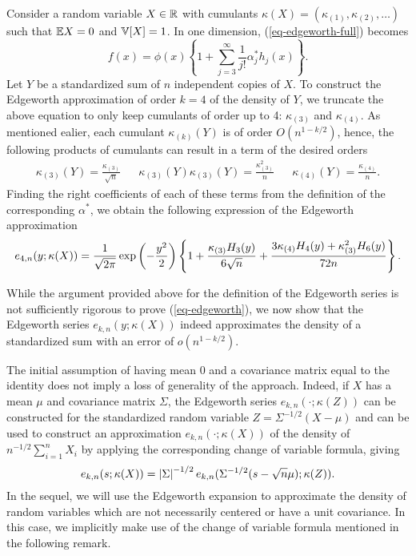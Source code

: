 \begin{example} \label{ex-edgeworth-1d}
    Consider a random variable $X \in \mathbb{R}$ with cumulants $\kappa(X) = (\kappa_{(1)}, \kappa_{(2)}, \ldots)$ such that $\mathbb{E}{X} = 0$ and $\mathbb{V}[X] = 1$. In one dimension, (\ref{eq-edgeworth-full}) becomes
    \begin{equation*}
        f(x) = \phi(x) \left\{
            1 + \sum_{j=3}^\infty  \frac{1}{j!}\alpha^*_j h_j(x)
        \right\}.
    \end{equation*}
    Let $Y$ be a standardized sum of $n$ independent copies of $X$. To construct the Edgeworth approximation of order $k = 4$ of the density of $Y$, we truncate the above equation to only keep cumulants of order up to 4: $\kappa_{(3)}$ and $\kappa_{(4)}$. As mentioned ealier, each cumulant $\kappa_{(k)}(Y)$ is of order $O(n^{1-k/2})$, hence, the following products of cumulants can result in a term of the desired orders
    \begin{align*}
        \kappa_{(3)}(Y) = \frac{\kappa_{(3)}}{\sqrt{n}} && \kappa_{(3)}(Y)\kappa_{(3)}(Y) = \frac{\kappa_{(3)}^2}{n} && \kappa_{(4)}(Y) = \frac{\kappa_{(4)}}{n}.
    \end{align*}
    Finding the right coefficients of each of these terms from the definition of the corresponding $\alpha^*$, we obtain the following expression of the Edgeworth approximation
    \begin{equation} \label{eq-edgeworth-1d-4}
        e_{4, n}(y; \kappa(X)) = \frac{1}{\sqrt{2\pi}}\exp\left(-\frac{y^2}{2}\right)\left\{1 + \frac{\kappa_{(3)} H_3(y)}{6\sqrt{n}} + \frac{3\kappa_{(4)} H_4(y) + \kappa_{(3)}^2 H_6(y)}{72 n}\right\}.
    \end{equation}
\end{example}

While the argument provided above for the definition of the Edgeworth series is not sufficiently rigorous to prove (\ref{eq-edgeworth}), we now show that the Edgeworth series $e_{k, n}(y; \kappa(X))$ indeed approximates the density of a standardized sum with an error of $o(n^{1-k/2})$.

\begin{remark} \label{rem-centering}
    The initial assumption of having mean 0 and a covariance matrix equal to the identity does not imply a loss of generality of the approach. Indeed, if $X$ has a mean $\mu$ and covariance matrix $\Sigma$, the Edgeworth series $e_{k, n}(\cdot; \kappa(Z))$ can be constructed for the standardized random variable $Z = \Sigma^{-1/2}(X - \mu)$ and can be used to construct an approximation $e_{k, n}(\cdot; \kappa(X))$ of the density of $n^{-1/2} \sum_{i=1}^n X_i$ by applying the corresponding change of variable formula, giving
    \begin{equation*}
        e_{k, n}(s; \kappa(X)) = \left|\Sigma\right|^{-1/2} e_{k, n}(\Sigma^{-1/2}(s - \sqrt{n}\mu); \kappa(Z)).
    \end{equation*}
    In the sequel, we will use the Edgeworth expansion to approximate the density of random variables which are not necessarily centered or have a unit covariance. In this case, we implicitly make use of the change of variable formula mentioned in the following remark. 
\end{remark}


